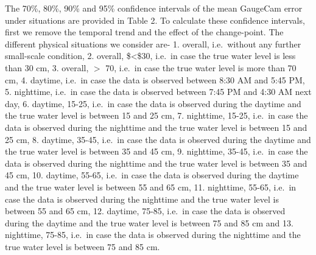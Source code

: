 \documentclass[]{article}
\begin{document}
The 70\%, 80\%, 90\% and 95\% confidence intervals of the mean GaugeCam error under situations are provided in Table 2. To calculate these confidence intervals, first we remove the temporal trend and the effect of the change-point. The different physical situations we consider are- 1. overall, i.e.~without any further small-scale condition, 2. overall, \$\textless{}\$30, i.e.~in case the true water level is less than 30 cm, 3. overall, \(>\) 70, i.e.~in case the true water level is more than 70 cm, 4. daytime, i.e.~in case the data is observed between 8:30 AM and 5:45 PM, 5. nighttime, i.e.~in case the data is observed between 7:45 PM and 4:30 AM next day, 6. daytime, 15-25, i.e.~in case the data is observed during the daytime and the true water level is between 15 and 25 cm, 7. nighttime, 15-25, i.e.~in case the data is observed during the nighttime and the true water level is between 15 and 25 cm, 8. daytime, 35-45, i.e.~in case the data is observed during the daytime and the true water level is between 35 and 45 cm, 9. nighttime, 35-45, i.e.~in case the data is observed during the nighttime and the true water level is between 35 and 45 cm, 10. daytime, 55-65, i.e.~in case the data is observed during the daytime and the true water level is between 55 and 65 cm, 11. nighttime, 55-65, i.e.~in case the data is observed during the nighttime and the true water level is between 55 and 65 cm, 12. daytime, 75-85, i.e.~in case the data is observed during the daytime and the true water level is between 75 and 85 cm and 13. nighttime, 75-85, i.e.~in case the data is observed during the nighttime and the true water level is between 75 and 85 cm.
\end{document}
